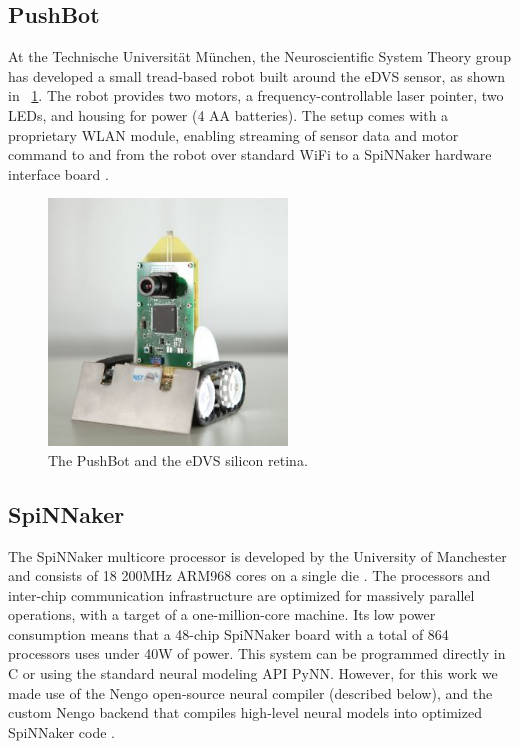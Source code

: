 \documentclass[conference]{IEEEtran}
\begin{document}
\subsection{PushBot}
At the Technische Universit{\"a}t M{\"u}nchen, the Neuroscientific
System Theory group has developed a small tread-based robot built around the 
eDVS sensor, as shown in \figurename~\ref{fig_sim}. The robot provides two motors, a frequency-controllable laser pointer, two LEDs, and housing for power (4 AA batteries). The setup comes with a proprietary WLAN module, enabling streaming of sensor data and motor command to and from the robot over standard WiFi to a SpiNNaker hardware interface board \cite{denk2013}.

\begin{figure}[!t]
\centering
\includegraphics[width=2.5in]{Pushbot1CroppedCropped.jpg}
\caption{The PushBot and the eDVS silicon retina.}
\label{fig_sim}
\end{figure}


\subsection{SpiNNaker}

The SpiNNaker multicore processor is developed by the University of Manchester 
and consists of 18 200MHz ARM968 cores on a single die \cite{furber2007neural, furber2014spinnaker}. 
The processors and inter-chip communication infrastructure are optimized for
massively parallel operations, with a target of a one-million-core machine.  Its
low power consumption means that a 48-chip SpiNNaker board with a total of 
864 processors uses under 40W of power. This system can be programmed directly 
in C or using the standard neural modeling API PyNN. However, for this work
we made use of the Nengo open-source neural compiler \cite{bekolay_nengo2014} 
(described below), and the custom Nengo backend that compiles high-level
neural models into optimized SpiNNaker code \cite{mundy2015}.
\end{document}
